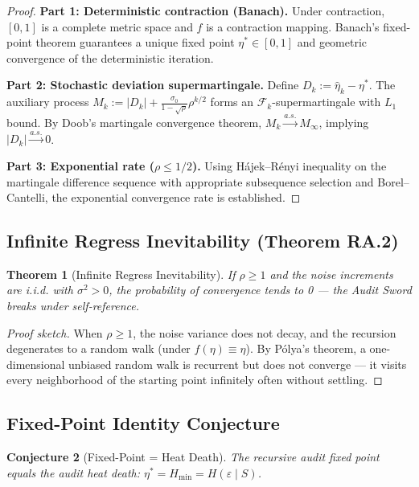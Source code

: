 \documentclass[12pt,a4paper]{article}
\newtheorem{theorem}{Theorem}[section]
\newtheorem{conjecture}[theorem]{Conjecture}
\newcommand{\cF}{\mathcal{F}}
\begin{document}
\begin{proof}[Proof]
\textbf{Part 1: Deterministic contraction (Banach).} Under contraction, $[0,1]$ is a complete metric space and $f$ is a contraction mapping. Banach's fixed-point theorem guarantees a unique fixed point $\eta^*\in[0,1]$ and geometric convergence of the deterministic iteration.

\textbf{Part 2: Stochastic deviation supermartingale.} Define $D_k:=\hat{\eta}_k-\eta^*$. The auxiliary process $M_k := |D_k| + \frac{\sigma_0}{1-\sqrt{\rho}}\rho^{k/2}$ forms an $\cF_k$-supermartingale with $L_1$ bound. By Doob's martingale convergence theorem, $M_k\xrightarrow{a.s.} M_\infty$, implying $|D_k|\xrightarrow{a.s.}0$.

\textbf{Part 3: Exponential rate ($\rho\leq1/2$).} Using H\'ajek--R\'enyi inequality on the martingale difference sequence with appropriate subsequence selection and Borel--Cantelli, the exponential convergence rate is established.
\end{proof}

\subsection{Infinite Regress Inevitability (Theorem RA.2)}

\begin{theorem}[Infinite Regress Inevitability]
\label{thm:divergence}
If $\rho\geq1$ and the noise increments are i.i.d. with $\sigma^2>0$, the probability of convergence tends to 0 --- the Audit Sword breaks under self-reference.
\end{theorem}

\begin{proof}[Proof sketch]
When $\rho\geq1$, the noise variance does not decay, and the recursion degenerates to a random walk (under $f(\eta)\equiv\eta$). By P\'olya's theorem, a one-dimensional unbiased random walk is recurrent but does not converge --- it visits every neighborhood of the starting point infinitely often without settling.
\end{proof}

\subsection{Fixed-Point Identity Conjecture}

\begin{conjecture}[Fixed-Point = Heat Death]
\label{conj:fixed-point}
The recursive audit fixed point equals the audit heat death: $\eta^* = H_{\min} = H(\varepsilon\mid S)$.
\end{conjecture}
\end{document}
